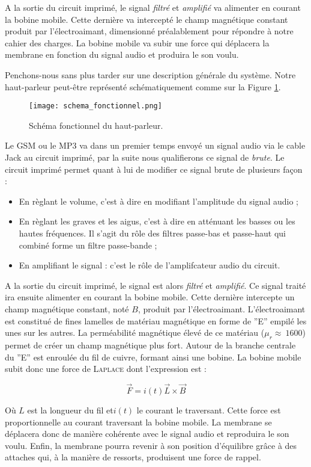 A la sortie du circuit imprimé, le signal \textit{filtré} et \textit{amplifié} va alimenter en courant la bobine mobile.
Cette dernière va intercepté le champ magnétique constant produit par l'électroaimant, dimensionné préalablement
pour répondre à notre cahier des charges. La bobine mobile va subir une force qui déplacera la membrane en fonction
du signal audio et produira le son voulu.


Penchons-nous sans plus tarder sur une description générale du système. Notre haut-parleur
peut-être représenté schématiquement comme sur la Figure \ref{block-diagram-hp}.

\begin{figure}[!htb]
	\centering
	\texttt{[image: schema\_fonctionnel.png]}
	\caption{Schéma fonctionnel du haut-parleur.}
	\label{block-diagram-hp}
\end{figure}

Le GSM ou le MP3 va dans un premier temps envoyé un signal audio via le cable Jack au circuit
imprimé, par la suite nous qualifierons ce signal de \textit{brute}. Le circuit imprimé permet
quant à lui de modifier ce signal brute de plusieurs façon : 

\begin{itemize}
	\item En règlant le volume, c'est à dire en modifiant l'amplitude du signal audio ;
	\item En règlant les graves et les aigus, c'est à dire en atténuant les basses ou les hautes
	fréquences. Il s'agit du rôle des filtres passe-bas et passe-haut qui combiné forme un filtre 
	passe-bande ;
	\item En amplifiant le signal : c'est le rôle de l'amplifcateur audio du circuit.
\end{itemize}

A la sortie du circuit imprimé, le signal est alors \textit{filtré} et \textit{amplifié}.
Ce signal traité ira ensuite alimenter en courant la bobine mobile. Cette 
dernière intercepte un champ magnétique constant, noté $B$, produit par l'électroaimant.
L'électroaimant est constitué de fines lamelles de matériau magnétique en forme de ''E'' 
empilé les unes sur les autres. La perméabilité magnétique élevé de ce matériau
($\mu_r \approx \ 1600$) permet de créer un champ magnétique plus fort. Autour de la branche
centrale du ''E'' est enroulée du fil de cuivre, formant ainsi une bobine.
La bobine mobile subit donc une force de \textsc{Laplace} dont l'expression est :

$$\vec{F} = i(t)\vec{L}\times{\vec{B}}$$ 

Où $L$ est la longueur du fil et$i(t)$ le courant le traversant. Cette force est proportionnelle
au courant traversant
la bobine mobile. La membrane se déplacera donc de manière cohérente avec le signal audio
et reproduira le son voulu. Enfin, la membrane pourra revenir à son position d'équilibre
grâce à des attaches qui, à la manière de ressorts, produisent une force de rappel.



